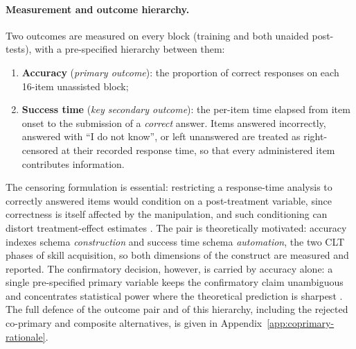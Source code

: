\paragraph{Measurement and outcome hierarchy.}
Two outcomes are measured on every block (training and both unaided post-tests), with a pre-specified hierarchy between them:
\begin{enumerate}
    \item \textbf{Accuracy} (\emph{primary outcome}): the proportion of correct responses on each 16-item unassisted block;
    \item \textbf{Success time} (\emph{key secondary outcome}): the per-item time elapsed from item onset to the submission of a \emph{correct} answer. Items answered incorrectly, answered with ``I do not know'', or left unanswered are treated as right-censored at their recorded response time, so that every administered item contributes information.
\end{enumerate}
The censoring formulation is essential: restricting a response-time analysis to correctly answered items would condition on a post-treatment variable, since correctness is itself affected by the manipulation, and such conditioning can distort treatment-effect estimates \parencite{montgomery2018post}. %
The pair is theoretically motivated: accuracy indexes schema \emph{construction} and success time schema \emph{automation}, the two CLT phases of skill acquisition, so both dimensions of the construct are measured and reported. The confirmatory decision, however, is carried by accuracy alone: a single pre-specified primary variable keeps the confirmatory claim unambiguous and concentrates statistical power where the theoretical prediction is sharpest \parencite{ich1998,pocock1997}. %
The full defence of the outcome pair and of this hierarchy, including the rejected co-primary and composite alternatives, is given in Appendix~\ref{app:coprimary-rationale}.

